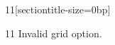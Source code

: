 \documentclass[paper=A4]{ropas-poster}
\begin{document}
\begin{postergrid}{1}{1}[sectiontitle-size=0bp]
\begin{posterblock}{1}{1}
Invalid grid option.
\end{posterblock}
\end{postergrid}
\end{document}
